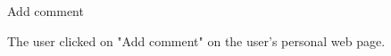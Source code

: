 \begin{uc}{Add comment}


    \begin{uc-trig}
        The user clicked on "Add comment" on the user's personal web page.
    \end{uc-trig}

\end{uc}
